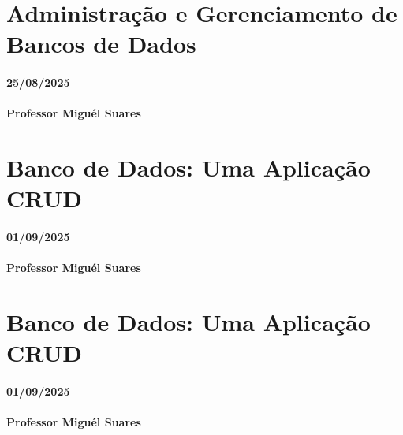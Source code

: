 \documentclass[
]{book}
\begin{document}
\chapter{Administração e Gerenciamento de Bancos de Dados}\label{administrauxe7uxe3o-e-gerenciamento-de-bancos-de-dados-1}

\subsubsection*{25/08/2025}\label{section-4}

\subsubsection*{Professor Miguél Suares}\label{professor-miguuxe9l-suares-4}

\chapter{Banco de Dados: Uma Aplicação CRUD}\label{banco-de-dados-uma-aplicauxe7uxe3o-crud}

\subsubsection*{01/09/2025}\label{section-5}

\subsubsection*{Professor Miguél Suares}\label{professor-miguuxe9l-suares-5}

\chapter{Banco de Dados: Uma Aplicação CRUD}\label{banco-de-dados-uma-aplicauxe7uxe3o-crud-1}

\subsubsection*{01/09/2025}\label{section-6}

\subsubsection*{Professor Miguél Suares}\label{professor-miguuxe9l-suares-6}
\end{document}
